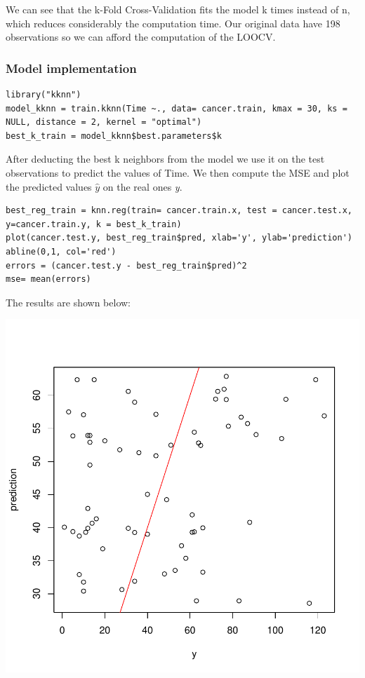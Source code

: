 \documentclass[]{report}
\begin{document}
We can see that the k-Fold Cross-Validation fits the model k times instead of n, which reduces considerably the computation time. Our original data have 198 observations so we can afford the computation of the LOOCV. \\

\subsubsection{Model implementation}

\begin{lstlisting}
library("kknn")
model_kknn = train.kknn(Time ~., data= cancer.train, kmax = 30, ks = NULL, distance = 2, kernel = "optimal")
best_k_train = model_kknn$best.parameters$k
\end{lstlisting}

After deducting the best k neighbors from the model we use it on the test observations to predict the values of Time. 
We then compute the MSE and plot the predicted values $\hat{y}$ on the real ones \textit{y}.

\begin{lstlisting}
best_reg_train = knn.reg(train= cancer.train.x, test = cancer.test.x, y=cancer.train.y, k = best_k_train)
plot(cancer.test.y, best_reg_train$pred, xlab='y', ylab='prediction')
abline(0,1, col='red')
errors = (cancer.test.y - best_reg_train$pred)^2
mse= mean(errors)
\end{lstlisting}

The results are shown below:

\begin{center}
	\includegraphics{Figures/knn_predicted_LOOCV.pdf}
\end{center}
\end{document}
